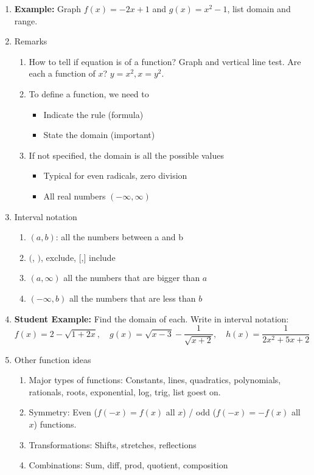 \documentclass{article}
\begin{document}
\begin{enumerate}
\begin{enumerate}
\item {\bf Example:} Graph $f(x) = -2x+1$ and $g(x)=x^2-1$, list domain and range.

\item Remarks
\begin{enumerate}
\item How to tell if equation is of a function? Graph and vertical line test. Are each a function of $x$? $y=x^2, x=y^2$.
\item To define a function, we need to
\begin{itemize}
\item Indicate the rule (formula)
\item State the domain (important)
\end{itemize}
\item If not specified, the domain is all the possible values
\begin{itemize}
\item Typical for even radicals, zero division
\item All real numbers $(-\infty, \infty)$
\end{itemize}
\end{enumerate}

\item Interval notation
\begin{enumerate}
\item $(a,b)$: all the numbers between a and b
\item $($, $)$, exclude, $[$,$]$ include
\item $(a, \infty)$ all the numbers that are bigger than $a$
\item $(-\infty, b)$ all the numbers that are less than $b$
\end{enumerate}
\item {\bf Student Example:} Find the domain of each. Write in interval notation:
$$f(x) = 2- \sqrt{1+2x}, \quad g(x) = \sqrt{x-3}-\frac{1}{\sqrt{x+2}}, \quad h(x) = \frac{1}{2x^2+5x+2}$$

\item Other function ideas
\begin{enumerate}
\item Major types of functions: Constants, lines, quadratics, polynomials, rationals, roots, exponential, log, trig, list goest on.
\item Symmetry: Even ($f(-x)=f(x)$ all $x$) / odd ($f(-x)=-f(x)$ all $x$) functions. 
\item Transformations: Shifts, stretches, reflections
\item Combinations: Sum, diff, prod, quotient, composition
\end{enumerate}
\end{enumerate}


\end{enumerate}
\end{document}
